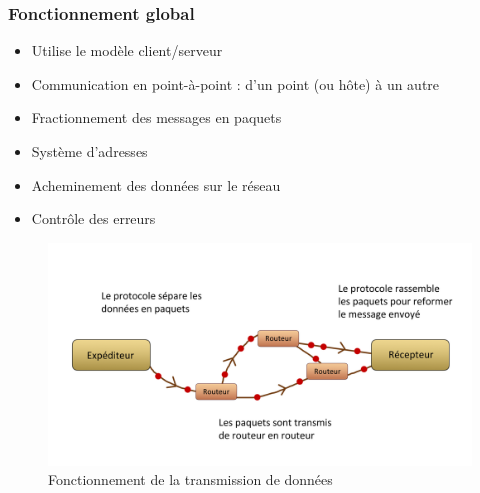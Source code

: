 \documentclass{beamer}
\begin{document}
\begin{frame}[allowframebreaks]
  \frametitle{Fonctionnement global}

    \begin{itemize}
      \item Utilise le modèle client/serveur
      \item Communication en point-à-point : d'un point (ou hôte) à un autre
      \item Fractionnement des messages en paquets
      \item Système d'adresses
      \item Acheminement des données sur le réseau
      \item Contrôle des erreurs
      
    \end{itemize}
    
    \begin{figure}
        \centering
        \includegraphics[scale=0.16]{TCP-IP}
        \caption{Fonctionnement de la transmission de données}
        \label{fig:my_label}
    \end{figure}
    
\end{frame}
\end{document}
